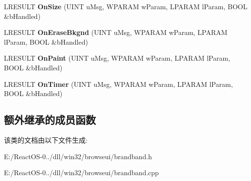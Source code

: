 \begin{DoxyCompactItemize}
$$L\+R\+E\+S\+U\+LT {\bfseries On\+Size} (U\+I\+NT u\+Msg, W\+P\+A\+R\+AM w\+Param, L\+P\+A\+R\+AM l\+Param, B\+O\+OL \&b\+Handled)
\item 
\mbox{\label{class_c_brand_band_ac84b1b7d39ff8fe1c1b2b071dad62864}} 
L\+R\+E\+S\+U\+LT {\bfseries On\+Erase\+Bkgnd} (U\+I\+NT u\+Msg, W\+P\+A\+R\+AM w\+Param, L\+P\+A\+R\+AM l\+Param, B\+O\+OL \&b\+Handled)
\item 
\mbox{\label{class_c_brand_band_ac448e8ab848791a03bd6a532a8c56d5f}} 
L\+R\+E\+S\+U\+LT {\bfseries On\+Paint} (U\+I\+NT u\+Msg, W\+P\+A\+R\+AM w\+Param, L\+P\+A\+R\+AM l\+Param, B\+O\+OL \&b\+Handled)
\item 
\mbox{\label{class_c_brand_band_a72bdb7347ab9518f82b0aa3a72a0e038}} 
L\+R\+E\+S\+U\+LT {\bfseries On\+Timer} (U\+I\+NT u\+Msg, W\+P\+A\+R\+AM w\+Param, L\+P\+A\+R\+AM l\+Param, B\+O\+OL \&b\+Handled)
\end{DoxyCompactItemize}
\subsection*{额外继承的成员函数}


该类的文档由以下文件生成\+:\begin{DoxyCompactItemize}
\item 
E\+:/\+React\+O\+S-\/0../dll/win32/browseui/brandband.\+h\item 
E\+:/\+React\+O\+S-\/0../dll/win32/browseui/brandband.\+cpp\end{DoxyCompactItemize}
